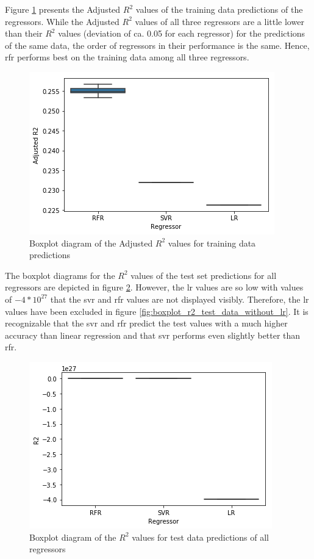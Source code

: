 \documentclass[a4paper, 11pt, oneside]{Thesis}  %
\begin{document}
Figure \ref{fig:boxplot_adj_r2_training_data} presents the Adjusted $R^2$ values of the training data predictions of the regressors. While the Adjusted $R^2$  values of all three regressors are a little lower than their $R^2$ values (deviation of ca. 0.05 for each regressor) for the predictions of the same data, the order of regressors in their performance is the same. Hence, \ac{rfr} performs best on the training data among all three regressors.

\begin{figure}[h]
\includegraphics[scale=0.7]{Figures/Regressor_comparison/boxplot_adj_r2_training_data.png}
\centering
\caption{Boxplot diagram of the Adjusted $R^2$ values for training data predictions}
\label{fig:boxplot_adj_r2_training_data}
\end{figure}

The boxplot diagrams for the $R^2$ values of the test set predictions for all regressors are depicted in figure \ref{fig:boxplot_r2_test_data_all}. However, the \ac{lr} values are so low with values of $-4 * 10^27$ that the \ac{svr} and \ac{rfr} values are not displayed visibly. Therefore, the \ac{lr} values have been excluded in figure \ref{fig:boxplot_r2_test_data_without_lr}. It is recognizable that the \ac{svr} and \ac{rfr} predict the test values with a much higher accuracy than linear regression and that \ac{svr} performs even slightly better than \ac{rfr}.

\begin{figure}[h]
\includegraphics[scale=0.7]{Figures/Regressor_comparison/boxplot_r2_test_data_all.png}
\centering
\caption{Boxplot diagram of the $R^2$ values for test data predictions of all regressors}
\label{fig:boxplot_r2_test_data_all}
\end{figure}
\end{document}
